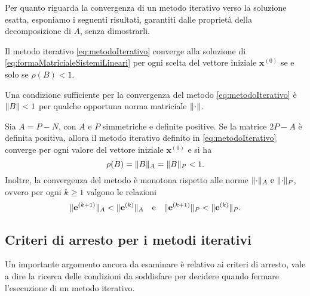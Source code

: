 Per quanto riguarda la convergenza di un metodo iterativo verso la soluzione esatta, esponiamo i seguenti risultati, garantiti dalle propriet\`a della decomposizione di $A$, senza dimostrarli.
\begin{teorema}
    Il metodo iterativo \eqref{eq:metodoIterativo} converge alla soluzione di \eqref{eq:formaMatricialeSistemiLineari} per ogni scelta del vettore iniziale
    $\mathbf{x}^{(0)}$ se e solo se $\rho(B)<1$.
\end{teorema}
\begin{corollario}
    \label{cor:condizioneSufficienteConvergenza}
    Una condizione sufficiente per la convergenza del metodo \eqref{eq:metodoIterativo} \`e $\lVert B\rVert<1$ per qualche opportuna norma matriciale $\lVert\cdot\rVert$.
\end{corollario}
\begin{teorema}
    \label{teo:convergenzaSimmetricaDefinitaPositiva}
    Sia $A = P - N$, con $A$ e $P$ simmetriche e definite positive. Se la matrice $2P - A$ \`e definita positiva, allora il metodo iterativo definito in \eqref{eq:metodoIterativo} converge per ogni valore del vettore iniziale $\mathbf{x}^{(0)}$ e si ha \[\rho(B) = \lVert B\rVert_{A} = \lVert B\rVert_{P} < 1.\]
    Inoltre, la convergenza del metodo \`e monotona rispetto alle norme $\lVert\cdot\rVert_{A} \ \text{e} \ \lVert\cdot\rVert_{P}$, ovvero per ogni $k \ge 1$ valgono le relazioni
    \begin{equation*}
        \lVert\mathbf{e}^{(k+1)}\rVert_{A} < \lVert\mathbf{e}^{(k)}\rVert_{A}\quad\text{e}\quad
        \lVert\mathbf{e}^{(k+1)}\rVert_{P} < \lVert\mathbf{e}^{(k)}\rVert_{P}.
    \end{equation*}
\end{teorema}
\subsection{Criteri di arresto per i metodi iterativi}
\label{sec:criteriArresto}
Un importante argomento ancora da esaminare \`e relativo ai criteri di arresto, vale a dire la ricerca delle condizioni da soddisfare per decidere quando fermare l'esecuzione di un
metodo iterativo.

